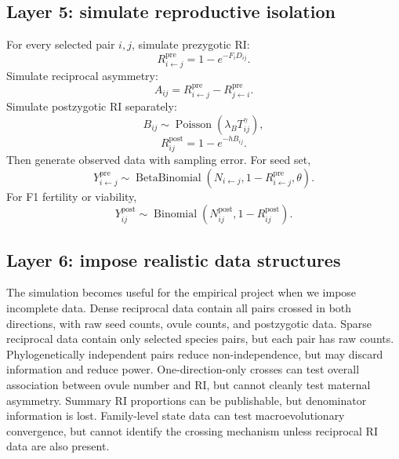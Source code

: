 \documentclass[11pt]{article}
\newcommand{\Rpre}{R^{\mathrm{pre}}}
\newcommand{\Rpost}{R^{\mathrm{post}}}
\begin{document}
\subsection{Layer 5: simulate reproductive isolation}

For every selected pair \(i,j\), simulate prezygotic RI:
\begin{equation}
\Rpre_{i\leftarrow j}=1-e^{-F_iD_{ij}}.
\end{equation}
Simulate reciprocal asymmetry:
\begin{equation}
A_{ij}=\Rpre_{i\leftarrow j}-\Rpre_{j\leftarrow i}.
\end{equation}
Simulate postzygotic RI separately:
\begin{equation}
B_{ij}\sim\operatorname{Poisson}(\lambda_BT_{ij}^{\gamma}),
\end{equation}
\begin{equation}
\Rpost_{ij}=1-e^{-hB_{ij}}.
\end{equation}
Then generate observed data with sampling error. For seed set,
\begin{equation}
Y^{\mathrm{pre}}_{i\leftarrow j}\sim
\operatorname{BetaBinomial}\left(N_{i\leftarrow j},1-\Rpre_{i\leftarrow j},\theta\right).
\end{equation}
For F1 fertility or viability,
\begin{equation}
Y^{\mathrm{post}}_{ij}\sim
\operatorname{Binomial}\left(N^{\mathrm{post}}_{ij},1-\Rpost_{ij}\right).
\end{equation}

\subsection{Layer 6: impose realistic data structures}

The simulation becomes useful for the empirical project when we impose incomplete data. Dense reciprocal data contain all pairs crossed in both directions, with raw seed counts, ovule counts, and postzygotic data. Sparse reciprocal data contain only selected species pairs, but each pair has raw counts. Phylogenetically independent pairs reduce non-independence, but may discard information and reduce power. One-direction-only crosses can test overall association between ovule number and RI, but cannot cleanly test maternal asymmetry. Summary RI proportions can be publishable, but denominator information is lost. Family-level state data can test macroevolutionary convergence, but cannot identify the crossing mechanism unless reciprocal RI data are also present.
\end{document}
